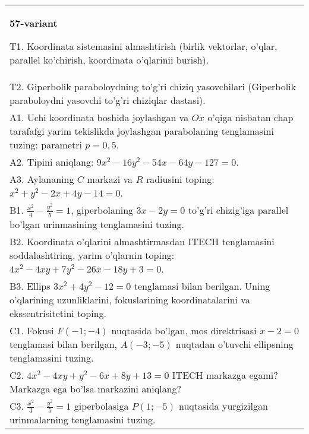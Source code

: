 \documentclass{article}
\begin{document}
\begin{tabular}{m{17cm}}
\textbf{57-variant}
\newline

T1. Koordinata sistemasini almashtirish (birlik vektorlar, o'qlar, parallel ko'chirish, koordinata o'qlarinii burish).\\

T2. Giperbolik paraboloydning to'g'ri chiziq yasovchilari (Giperbolik paraboloydni yasovchi to'g'ri chiziqlar dastasi).\\

A1. Uchi koordinata boshida joylashgan va $Ox$ o'qiga nisbatan chap tarafafgi yarim tekislikda joylashgan parabolaning tenglamasini tuzing: parametri $p=0,5$.\\

A2. Tipini aniqlang: $9x^{2}-16y^{2}-54x-64y-127=0$.\\

A3. Aylananing $C$ markazi va $R$ radiusini toping: $x^2+y^2-2x+4y-14=0$.\\

B1. $\frac{x^{2}}{4} - \frac{y^{2}}{5} = 1$, giperbolaning $3x - 2y = 0$ to'g'ri chizig'iga parallel bo'lgan urinmasining tenglamasini tuzing.  \\

B2. Koordinata o'qlarini almashtirmasdan ITECH tenglamasini soddalashtiring, yarim o'qlarnin toping: $4x^{2} - 4xy + 7y^{2} - 26x - 18y + 3 = 0$.\\

B3. Ellips $3x^{2} + 4y^{2} - 12 = 0$ tenglamasi bilan berilgan. Uning o'qlarining uzunliklarini, fokuslarining koordinatalarini va ekssentrisitetini toping.  \\

C1. Fokusi $F( - 1; - 4)$ nuqtasida bo'lgan, mos direktrisasi $x - 2 = 0$ tenglamasi bilan berilgan, $A( - 3; - 5)$ nuqtadan o'tuvchi ellipsning tenglamasini tuzing.  \\

C2. $4x^{2} - 4xy + y^{2} - 6x + 8y + 13 = 0$ ITECH markazga egami? Markazga ega bo'lsa markazini aniqlang?  \\

C3. $\frac{x^{2}}{3} - \frac{y^{2}}{5} = 1$ giperbolasiga $P(1; - 5)$ nuqtasida yurgizilgan urinmalarning tenglamasini tuzing.\\

\end{tabular}
\vspace{1cm}
\end{document}
